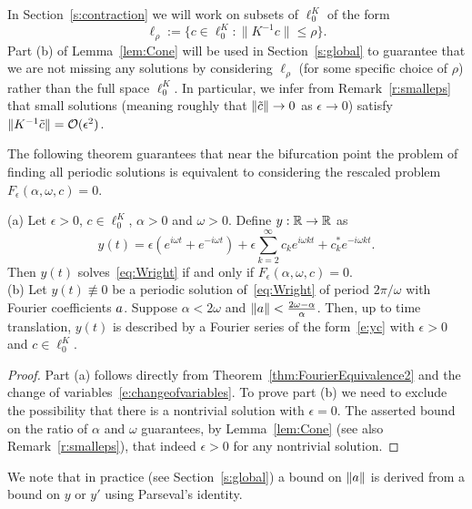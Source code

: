 \begin{remark}\label{r:rhobound}
In Section~\ref{s:contraction} we will work on subsets of $\ell^K_0$ of the form
\[
  \ell_\rho := \{ c \in \ell^K_0 : \|K^{-1} c\| \leq \rho \} .
\]
Part (b) of Lemma~\ref{lem:Cone} will be used in Section~\ref{s:global} to guarantee that we are not missing any solutions by considering $\ell_\rho$ (for some specific choice of $\rho$) rather than the full space $\ell^K_0$.
In particular, we infer from Remark~\ref{r:smalleps} that  small solutions (meaning roughly that $\|\tilde{c}\| \to 0$ as $\epsilon \to 0$)
satisfy $\| K^{-1} \tilde{c} \| = \mathcal{O}(\epsilon^2)$.
\end{remark}

The following theorem guarantees that near the bifurcation point the problem of finding all periodic solutions is equivalent to considering the rescaled problem $F_\epsilon(\alpha,\omega,c)=0$.
\begin{theorem}
\label{thm:FourierEquivalence3}
\textup{(a)} Let $ \epsilon > 0$,  $c \in \ell^K_0$, $\alpha>0$ and $ \omega >0$. 
	Define $y: \mathbb{R}\to \mathbb{R}$ as 
\begin{equation}\label{e:yc}
	y(t) = 
	\epsilon \left( e^{i \omega t }  + e^{- i \omega t }\right) 
	+ \epsilon  \sum_{k = 2}^\infty   c_k e^{i \omega k t }  + c_k^* e^{- i \omega k t } .
\end{equation}
	Then $y(t)$ solves~\eqref{eq:Wright} if and only if $F_{\epsilon}( \alpha , \omega , c) = 0$.\\
\textup{(b)}
Let $y(t) \not\equiv 0$ be a periodic solution of~\eqref{eq:Wright} of period $2\pi/\omega$
 with Fourier coefficients $a$.
Suppose $\alpha < 2\omega$ and $\| a \| < \frac{2 \omega - \alpha}{\alpha} $.
Then, up to time translation, $y(t)$ is described by a Fourier series of the form~\eqref{e:yc} with $\epsilon > 0$ and $c \in \ell^K_0$.
\end{theorem}

\begin{proof}
Part (a) follows directly from Theorem~\ref{thm:FourierEquivalence2} and the  change of variables~\eqref{e:changeofvariables}.
To prove part (b) we need to exclude the possibility that there is a nontrivial solution with $\epsilon=0$. The asserted bound on the ratio of $\alpha$ and $\omega$ guarantees, by Lemma~\ref{lem:Cone} (see also Remark~\ref{r:smalleps}), that indeed $\epsilon>0$ for any nontrivial solution. 
\end{proof}

We note that in practice (see Section~\ref{s:global}) a bound on $\| a \|$ is derived from a bound on $y$ or $y'$ using Parseval's identity.

